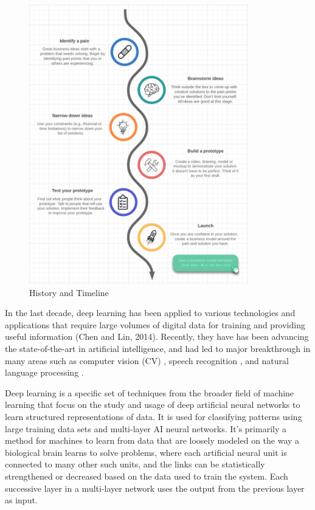 \begin{figure}[htbp]
\centering
\includegraphics[width=0.85\textwidth]{images/timeline-1.png}
\caption{History and Timeline}
\label{fig:timeline}
\end{figure}

In the last decade, deep learning has been applied to various technologies and applications that require large volumes of digital data for training and providing useful information (Chen and Lin, 2014). Recently, they have has been advancing the state-of-the-art in artificial intelligence, and had led to major breakthrough in many areas such as computer vision (CV) \cite{krizhevsky2012imagenet} \cite{karpathy2014large}, speech recognition \cite{graves2013speech} \cite{mohamed2012acoustic}, and natural language processing \cite{bengio2003neural} \cite{mikolov2013distributed} \cite{mikolov2010recurrent}.

Deep learning \cite{Polson2018} is a specific set of techniques from the broader field of machine learning that focus on the study and usage of deep artificial neural networks to learn structured representations of data. It is used for classifying patterns using large training data sets and multi-layer AI neural networks. It's primarily a method for machines to learn from data that are loosely modeled on the way a biological brain learns to solve problems, where each artificial neural unit is connected to many other such units, and the links can be statistically strengthened or decreased based on the data used to train the system. Each successive layer in a multi-layer network uses the output from the previous layer as input.

